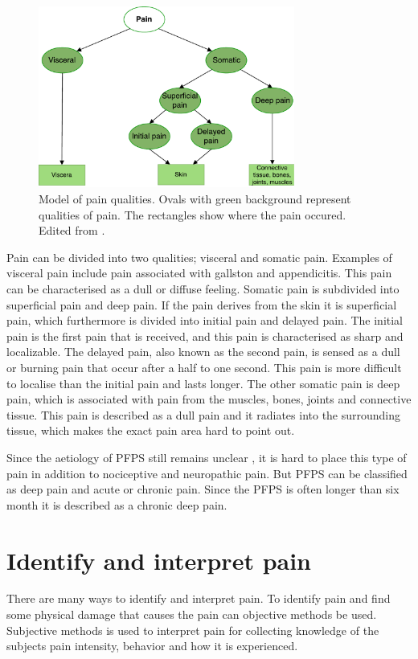\begin{figure} [H]
\centering
\includegraphics[width=0.75\textwidth]{figures/painpic}
\caption{Model of pain qualities. Ovals with green background  represent qualities of pain. The rectangles show where the pain occured. Edited from \citep{Schmidt2013}.}
\label{fig:qualities}
\end{figure}

\noindent
Pain can be divided into two qualities; visceral and somatic pain. Examples of visceral pain include pain associated with gallston and appendicitis. This pain can be characterised as a dull or diffuse feeling. Somatic pain is subdivided into superficial pain and deep pain. If the pain derives from the skin it is superficial pain, which furthermore is divided into initial pain and delayed pain. The initial pain is the first pain that is received, and this pain is characterised as sharp and localizable. The delayed pain, also known as the second pain, is sensed as a dull or burning pain that occur after a half to one second. This pain is more difficult to localise than the initial pain and lasts longer.\citep{Schmidt1989, Schmidt2013}
The other somatic pain is deep pain, which is associated with pain from the muscles, bones, joints and connective tissue. This pain is described as a dull pain and it radiates into the surrounding tissue, which makes the exact pain area hard to point out.\citep{Schmidt1989, Schmidt2013}


\noindent
Since the aetiology of PFPS still remains unclear \citep{Smith2015}, it is hard to place this type of pain in addition to nociceptive and neuropathic pain. But PFPS can be classified as deep pain and acute or chronic pain. Since the PFPS is often longer than six month it is described as a chronic deep pain. 


\section{Identify and interpret pain}
There are many ways to identify and interpret pain. To identify pain and find some physical damage that causes the pain can objective methods be used. Subjective methods is used to interpret pain for collecting knowledge of the subjects pain intensity, behavior and how it is experienced.\citep{Younger2009}

